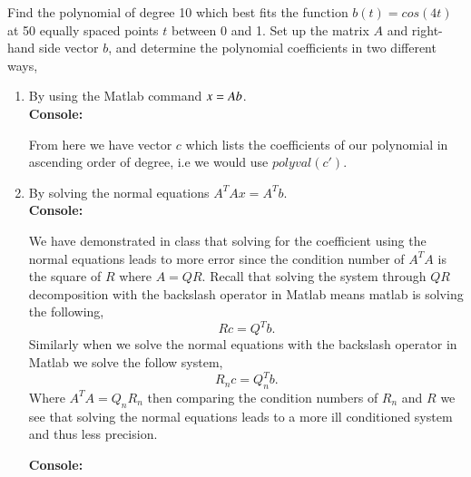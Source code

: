 \documentclass[12pt]{article}
\makeatletter
\theoremstyle{homework}
\newenvironment{exercise}[1]
{\def\@currentlabel{#1}\exercisecore}
{\endexercisecore}
\makeatother
\begin{document}
\begin{exercise}{Exercise 7.14} Find the polynomial of degree 10 which best fits the function $b(t) = cos(4t)$ at 50
  equally spaced points $t$ between 0 and 1. Set up the matrix $A$ and right-hand side vector $b$, and determine 
  the polynomial coefficients in two different ways,\\

  \begin{enumerate}
    \item By using the Matlab command $x = A\/b$.\\
    
    \textbf{Console:}
    \begin{center}
    
    \end{center}
  From here we have vector $c$ which lists the coefficients of our polynomial in ascending order of degree, i.e we would use 
  $polyval(c')$.
  \vspace{.25in}

    \item By solving the normal equations $A^{T}Ax = A^Tb$.\\
  
    \textbf{Console:}
    \begin{center}
    
    \end{center}
    We have demonstrated in class that solving for the coefficient using the normal equations leads to more error since the condition number of 
    $A^TA$ is the square of $R$ where $A = QR$. Recall that solving the system through $QR$ decomposition with the backslash operator in Matlab means matlab is solving the following,
    \begin{equation*}
      Rc = Q^Tb.
    \end{equation*}
    Similarly when we solve the normal equations with the backslash operator in Matlab we solve the follow system,
    \begin{equation*}
      R_nc = Q_n^Tb.
    \end{equation*}
Where $A^TA = Q_nR_n$ then comparing the condition numbers of $R_n$ and $R$ we see that solving the normal equations leads to a more ill conditioned system and thus less precision.
  
\textbf{Console:}
\begin{center}

\end{center}
\end{enumerate}
\end{exercise}
\end{document}
